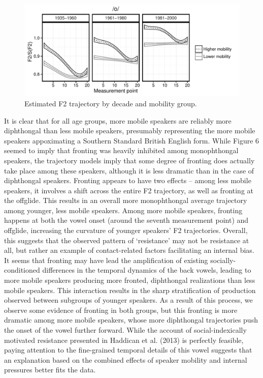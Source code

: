 \documentclass[12pt]{article}
\begin{document}
\vspace*{6pt}
\begin{figure}[H]
\centering
\includegraphics[scale=0.9]{owdynamicsclass.pdf}
\caption{Estimated  F2 trajectory by decade and mobility group.}
\end{figure}
\vspace*{6pt}
 It is clear that for all age groups, more mobile speakers are reliably more diphthongal than less mobile speakers, presumably representing the more mobile speakers appoximating a Southern Standard British English form. While Figure 6 seemed to imply that fronting was heavily inhibited among monophthongal speakers, the trajectory models imply that some degree of fronting does actually take place among these speakers, although it is less dramatic than in the case of diphthongal speakers. Fronting appears to have two effects -- among less mobile speakers, it involves a shift across the entire F2 trajectory, as well as fronting at the offglide. This results in an overall more monophthongal average trajectory among younger, less mobile speakers. Among more mobile speakers, fronting happens at both the vowel onset (around the seventh measurement point) and offglide, increasing the curvature of younger speakers' F2 trajectories. Overall, this suggests that the observed pattern of `resistance' may not be resistance at all, but rather an example of contact-related factors facilitating an internal bias. It seems that fronting may have lead the amplification of existing socially-conditioned differences in the temporal dynamics of the back vowels, leading to more mobile speakers producing more fronted, diphthongal realizations than less mobile speakers. This interaction results in the sharp stratification of  production observed between subgroups of younger speakers. As a result of this process, we observe some evidence of fronting in both groups, but this fronting is more dramatic among more mobile speakers, whose more diphthongal trajectories push the onset of the vowel further forward. While the account of social-indexically motivated resistance presented in Haddican et al. (2013) is perfectly feasible, paying attention to the fine-grained temporal details of this vowel suggests that an explanation based on the combined effects of speaker mobility and internal pressures better fits the data.
\end{document}
